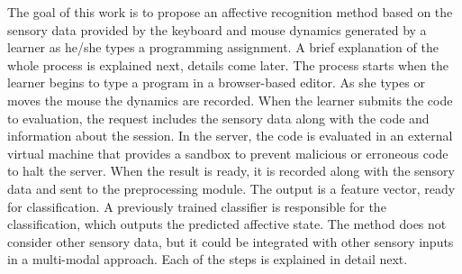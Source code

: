 \documentclass[a4paper,twoside]{article}
\begin{document}
The goal of this work is to propose an affective
recognition method based on the sensory data provided by the keyboard and mouse
dynamics generated by a learner as he/she types a programming assignment. A brief explanation of the
whole process is explained next, details come later. The process starts when the
learner begins to type a program in a browser-based editor. As she types or
moves the mouse the dynamics are recorded. When the learner submits the code to
evaluation, the request includes the sensory data along with the code and
information about the session. In the server, the code is evaluated in an
external virtual machine that provides a sandbox to prevent malicious or
erroneous code to halt the server. When the result is ready, it is recorded
along with the sensory data and sent to the preprocessing module. The output is
a feature vector, ready for classification. A previously trained classifier is
responsible for the classification, which outputs the predicted affective state.
The method does not consider other sensory data, but it could be integrated with
other sensory inputs in a multi-modal approach.  Each of the steps is explained
in detail next.
\end{document}
